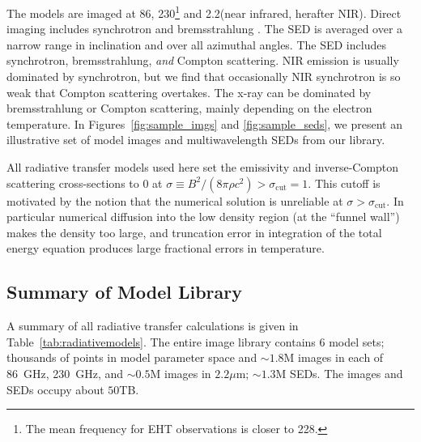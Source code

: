 The models are imaged at 86\GHz, 230\GHz\footnote{The mean frequency for  EHT observations is closer to 228\GHz.} and 2.2\um (near infrared, herafter NIR).
Direct imaging includes synchrotron and bremsstrahlung \citep[both ion-electron and electron-electron; see][for a recent review]{2020ApJ...898...50Y}.
The SED is averaged over a narrow range in inclination and over all azimuthal angles.
The SED includes synchrotron, bremsstrahlung, \emph{and} Compton scattering.
NIR emission is usually dominated by synchrotron, but we find that occasionally NIR synchrotron is so weak that Compton scattering overtakes.
The x-ray can be dominated by bremsstrahlung or Compton scattering, mainly depending on the electron temperature.
In Figures~\ref{fig:sample_imgs} and \ref{fig:sample_seds}, we present an illustrative set of model images and multiwavelength SEDs from our library.

All radiative transfer models used here set the emissivity and inverse-Compton scattering cross-sections to $0$ at $\sigma \equiv B^2/(8\pi\rho c^2) > \sigma_\mathrm{cut} = 1$.  This cutoff is motivated by the notion that the numerical solution is unreliable at $\sigma > \sigma_\mathrm{cut}$.  In particular numerical diffusion into the low density region (at the ``funnel wall'') makes the density too large, and truncation error in integration of the total energy equation produces large fractional errors in temperature.

\subsection{Summary of \sgra Model Library}


A summary of all radiative transfer calculations is given in Table~\ref{tab:radiativemodels}. The entire image library
contains $6$ model sets; thousands of points in model parameter space and
$\sim 1.8$M images in each of 86~GHz, 230~GHz, and $\sim0.5$M images in $2.2\mu$m;
$\sim1.3$M SEDs.  The images and SEDs occupy about $50$TB.

